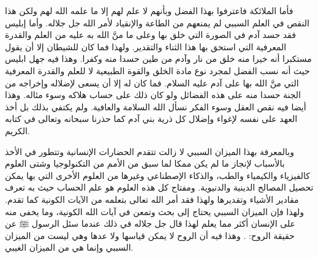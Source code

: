 فأما الملائكة فاعترفوا بهذا الفضل وبأنهم لا علم لهم إلا ما علمه الله لهم ولكن هذا النقص في العلم السببي لم يمنعهم من الطاعة والإنقياد لأمر الله جل جلاله. وأما إبليس فقد حسد آدم في الصورة التي خلق بها وعلى ما منَّ الله به عليه من العلم والقدرة المعرفية التي استحق بها هذا الثناء والتقدير. ولهذا فما كان للشيطان إلا أن يقول مستكبرا أنه خيرا منه خلق من نار وآدم من طين حسدا منه وكفرا. وهذا فيه جهل ابليس حيث أنه نسب الفضل لمجرد نوع مادة الخلق والقوة الطبيعية لا للعلم والقدرة المعرفية التي منَّ الله بها على آدم عليه السلام. فما كان له إلا أن يسعى لإضلاله وإخراجه من الجنة حسدا منه على هذه الفضائل ولو كان ذلك على حساب هلاكه وسوء مئاله. وهذا أيضا فيه نقص العقل وسوء الفكر نسأل الله السلامة والعافية. ولم يكتفي بذلك بل أخذ العهد على نفسه لإغواء وإضلال كل ذرية بني آدم كما حذرنا سبحانه وتعالى في كتابه الكريم.

وبالمعرفة بهذا الميزان السببي لا زالت تتقدم الحضارات الإنسانية وتتطور في الأخذ بالأسباب لإنجاز ما لم يكن ممكا لما سبق من الأمم من التكنولوجيا وشتى العلوم كالفيزياء والكيمياء والطب، والذكاء الإصطناعي وغيرها من العلوم الأخرى التي بها يمكن تحصيل المصالح الدينية والدنيوية. ومفتاح كل هذه العلوم هو علم الحساب حيث به تعرف مقادير الأشياء وتقديرها ولهذا فقد أمر الله تعالى بتعلمه من الآيات الكونية كما تقدم. ولهذا فإن الميزان السببي يحتاج إلى بحث وتمعن في آيات الله الكونية، وما يخفى منه على الإنسان أكثر مما يعلم لهذا قال جل جلاله في ذلك عندما سئل الرسول ﷺ عن حقيقة الروح: 
\quranayah*[17][85]{\footnotesize \surahname*[17]}. وهذا فيه أن الروح لا يمكن قياسها ولا عدها وهي ليست من الميزان السببي وإنما هي من الميزان الغيبي. 

